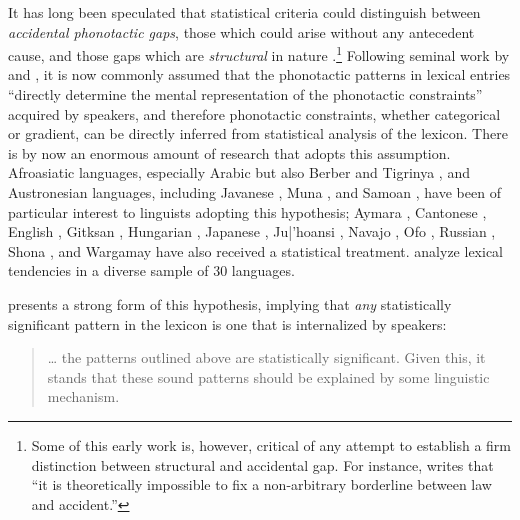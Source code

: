 \label{turkish}

It has long been speculated that statistical criteria could distinguish between \emph{accidental phonotactic gaps}, those which could arise without any antecedent cause, and those gaps which are \emph{structural} in nature \citep[e.g.,][]{Fischer-Jorgensen1952,Saporta1955,Saporta1958,Vogt1954}.\footnote{
    Some of this early work is, however, critical of any attempt to establish a firm distinction between structural and accidental gap.
    For instance, \citet[3]{Fischer-Jorgensen1952} writes that ``it is theoretically impossible to fix a non-arbitrary borderline between law and accident.''}
Following seminal work by \citet{Mester1988} and \citet{McCarthy1988}, it is now commonly assumed that the phonotactic patterns in lexical entries ``directly determine the mental representation of the phonotactic constraints'' \citep[180]{Frisch2004} acquired by speakers, and therefore phonotactic constraints, whether categorical or gradient, can be directly inferred from statistical analysis of the lexicon.
There is by now an enormous amount of research that adopts this assumption.
Afroasiatic languages, especially Arabic \citep{Coetzee2008a,Frisch2004,McCarthy1988,Pierrehumbert1993} but also Berber \citep{Elmedlaoui1995} and Tigrinya \citep{Buckley1997}, and Austronesian languages, including Javanese \citep{GraffInPress,Mester1988}, Muna \citep{Anttila2008a,Coetzee2008a}, and Samoan \citep{AldereteInPress}, have been of particular interest to linguists adopting this hypothesis; Aymara \citep{GraffInPress}, Cantonese \citep{Yip1989}, English \citep{Berkley1994a,Berkley1994b,Berkley2000,Coetzee2008b,Davis1989,Martin2007,Martin2011}, Gitksan \citep{Brown2010}, Hungarian \citep{Grimes2010}, Japanese \citep{Kawahara2006}, Ju|'hoansi \citep{Kinney2005}, Navajo \citep{Martin2007,Martin2011}, Ofo \citep[38f.]{MacEachern1999}, Russian \citep{Padgett1991,Padgett1992}, Shona \citep{Hayes2008a}, and Wargamay \citep{Hayes2008a} have also received a statistical treatment. 
\citet{Pozdniakov2007} analyze lexical tendencies in a diverse sample of 30 languages.

\citet{Brown2010} presents a strong form of this hypothesis, implying that \emph{any} statistically significant pattern in the lexicon is one that is internalized by speakers:

\begin{quote}
\ldots{} the patterns outlined above are statistically significant. Given this, it stands that these sound patterns should be explained by some linguistic mechanism. \citep[][48]{Brown2010}
\end{quote}

